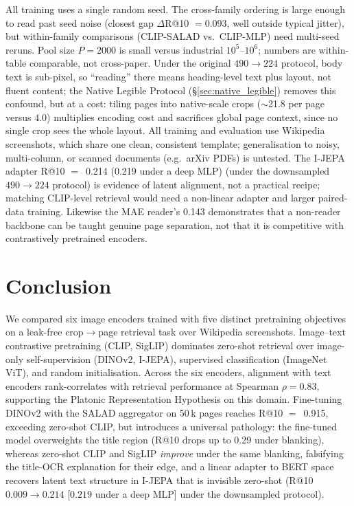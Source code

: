 \documentclass{article}
\begin{document}
All training uses a single random seed. The cross-family
ordering is large enough to read past seed noise (closest gap
$\Delta$R@10 $=0.093$, well outside typical jitter), but
within-family comparisons (CLIP-SALAD vs.\ CLIP-MLP) need
multi-seed reruns. Pool size $P{=}2000$ is small versus industrial
$10^5$--$10^6$; numbers are within-table comparable, not cross-paper.
Under the original $490{\to}224$ protocol, body text is sub-pixel,
so ``reading'' there means heading-level text plus layout, not
fluent content; the Native Legible Protocol
(\S\ref{sec:native_legible}) removes this confound, but at a cost:
tiling pages into native-scale crops ($\sim$21.8 per page versus
4.0) multiplies encoding cost and sacrifices global page context,
since no single crop sees the whole layout. All training and
evaluation use Wikipedia screenshots, which share one clean,
consistent template; generalisation to noisy, multi-column, or
scanned documents (e.g.\ arXiv PDFs) is untested. The I-JEPA
adapter R@10 $=$~0.214 (0.219 under a deep MLP) (under the downsampled $490{\to}224$ protocol)
is evidence of latent alignment, not a practical recipe; matching CLIP-level retrieval would need a
non-linear adapter and larger paired-data training. Likewise the
MAE reader's 0.143 demonstrates that a non-reader backbone can be
taught genuine page separation, not that it is competitive with
contrastively pretrained encoders.

\section{Conclusion}
\label{sec:conclusions}

We compared six image encoders trained with five distinct
pretraining objectives on a leak-free crop$\rightarrow$page
retrieval task over Wikipedia screenshots. Image--text contrastive
pretraining (CLIP, SigLIP) dominates zero-shot retrieval over
image-only self-supervision (DINOv2, I-JEPA), supervised
classification (ImageNet ViT), and random initialisation. Across
the six encoders, alignment with text encoders rank-correlates
with retrieval performance at Spearman $\rho = 0.83$, supporting
the Platonic Representation Hypothesis on this domain.
Fine-tuning DINOv2 with the SALAD aggregator on 50\,k pages
reaches R@10 $=$~0.915, exceeding zero-shot CLIP, but introduces a
universal pathology: the fine-tuned model overweights the title
region (R@10 drops up to 0.29 under blanking), whereas zero-shot
CLIP and SigLIP \emph{improve} under the same blanking, falsifying
the title-OCR explanation for their edge, and a linear adapter to BERT
space recovers latent text structure in I-JEPA that is invisible
zero-shot (R@10 $0.009\!\to\!0.214$ [$0.219$ under a deep MLP] under the downsampled protocol).
\end{document}
